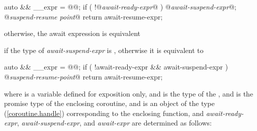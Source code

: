 \begin{codeblock}
{
  auto && __expr = @@;
  if ( !@\textit{await-ready-expr}@ ) {
    @\textit{await-suspend-expr}@;
    @\textit{suspend-resume point}@
  }
  return await-resume-expr;
}
\end{codeblock}

otherwise, the await expression is equivalent









if the type of \textit{await-suspend-expr} is , otherwise it is equivalent to

\begin{codeblock}
{
  auto && __expr = @@;
  if ( !await-ready-expr && await-suspend-expr ) {
    @\textit{suspend-resume-point}@
  }
  return await-resume-expr;
}
\end{codeblock}

where  is a variable defined for
exposition only, and  is the type of the
, and  is the 
promise type of the enclosing coroutine,
and 
is an object of the type  (\ref{coroutine.handle}) corresponding to the enclosing function,
and \textit{await-ready-expr}, \textit{await-suspend-expr}, and \textit{await-expr} are
determined as follows:


